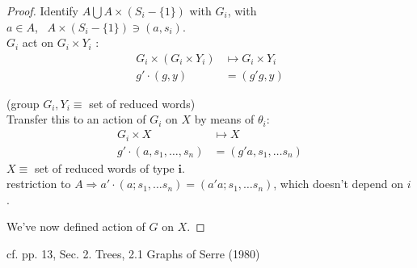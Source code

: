 \begin{proof}
Identify $A \bigcup A \times (S_i - \lbrace 1 \rbrace )$ with $G_i$, with \\
\phantom{Identify} $a \in A$, \, $A \times (S_i - \lbrace 1 \rbrace) \ni (a, s_i)$. \\

$G_i$ act on $G_i \times Y_i$ :  \\
\[
\begin{aligned}
G_i \times (G_i \times Y_i) & \mapsto G_i \times Y_i \\
g' \cdot (g, y) & = (g' g , y)
\end{aligned}
\]

(group $G_i, Y_i \equiv $ set of reduced words) \\

Transfer this to an action of $G_i$ on $X$ by means of $\theta_i$: \\
\[
\begin{aligned}
G_i \times X & \mapsto X \\
g' \cdot (a, s_1, \dots , s_n) & = (g'a, s_1 , \dots s_n) 
\end{aligned}
\]
$X \equiv $ set of reduced words of type $\mathbf{i}$. \\

restriction to $A \Longrightarrow a' \cdot (a; s_1 , \dots s_n ) = (a'a ; s_1, \dots s_n)$, which doesn't depend on $i$.

We've now defined action of $G$ on $X$.

\end{proof}


cf. pp. 13, Sec. 2. Trees, 2.1 Graphs of Serre (1980) \cite{agat:Serr1980}

